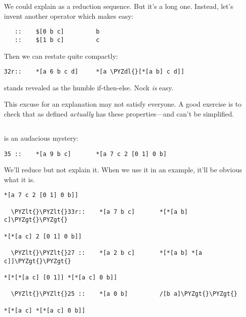 We could explain  as a reduction sequence.  But it's a long
one.  Instead, let's invent another operator which makes  easy:

\begin{verbatim}
   ::    $[0 b c]         b
   ::    $[1 b c]         c
\end{verbatim}

Then we can restate  quite compactly:

\begin{framed_shaded}
\begin{Verbatim}[fontsize=\relsize{-2.5},fontseries=b,commandchars=\\\{\}]
32r::    *[a 6 b c d]     *[a \PYZdl{}[*[a b] c d]]
\end{Verbatim}
\end{framed_shaded}

 stands revealed as the humble if-then-else.  Nock \emph{is} easy.

This excuse for an explanation may not satisfy everyone.  A good
exercise is to check that  as defined \emph{actually} has these
properties---and can't be simplified.

\subsection{}

 is an audacious mystery:

\begin{framed_shaded}
\begin{Verbatim}[fontsize=\relsize{-2.5},fontseries=b,commandchars=\\\{\}]
35 ::    *[a 9 b c]       *[a 7 c 2 [0 1] 0 b]
\end{Verbatim}
\end{framed_shaded}

We'll reduce  but not explain it.  When we use it in an
example, it'll be obvious what it is.

\begin{framed_shaded}
\begin{Verbatim}[fontsize=\relsize{-2.5},fontseries=b,commandchars=\\\{\}]
*[a 7 c 2 [0 1] 0 b]]

  \PYZlt{}\PYZlt{}33r::    *[a 7 b c]       *[*[a b] c]\PYZgt{}\PYZgt{}

*[*[a c] 2 [0 1] 0 b]]

  \PYZlt{}\PYZlt{}27 ::    *[a 2 b c]       *[*[a b] *[a c]]\PYZgt{}\PYZgt{}

*[*[*[a c] [0 1]] *[*[a c] 0 b]]

  \PYZlt{}\PYZlt{}25 ::    *[a 0 b]         /[b a]\PYZgt{}\PYZgt{}

*[*[a c] *[*[a c] 0 b]]
\end{Verbatim}
\end{framed_shaded}

